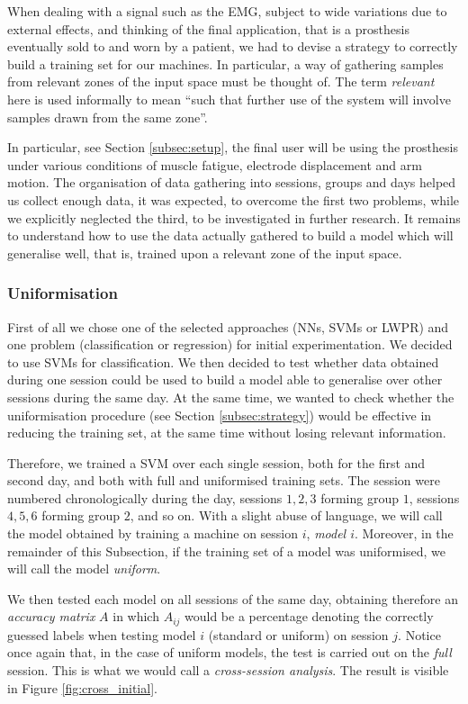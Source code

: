 When dealing with a signal such as the EMG, subject to wide variations
due to external effects, and thinking of the final application, that
is a prosthesis eventually sold to and worn by a patient, we had to
devise a strategy to correctly build a training set for our
machines. In particular, a way of gathering samples from relevant
zones of the input space must be thought of. The term \emph{relevant}
here is used informally to mean ``such that further use of the system
will involve samples drawn from the same zone''.

In particular, see Section \ref{subsec:setup}, the final user will be
using the prosthesis under various conditions of muscle fatigue,
electrode displacement and arm motion. The organisation of data
gathering into sessions, groups and days helped us collect enough
data, it was expected, to overcome the first two problems, while we
explicitly neglected the third, to be investigated in further
research. It remains to understand how to use the data actually
gathered to build a model which will generalise well, that is, trained
upon a relevant zone of the input space.

\subsubsection{Uniformisation}

First of all we chose one of the selected approaches (NNs, SVMs or
LWPR) and one problem (classification or regression) for initial
experimentation. We decided to use SVMs for classification. We then
decided to test whether data obtained during one session could be used
to build a model able to generalise over other sessions during the
same day. At the same time, we wanted to check whether the
uniformisation procedure (see Section \ref{subsec:strategy}) would be
effective in reducing the training set, at the same time without
losing relevant information.

Therefore, we trained a SVM over each single session, both for the
first and second day, and both with full and uniformised training
sets. The session were numbered chronologically during the day,
sessions $1,2,3$ forming group $1$, sessions $4,5,6$ forming group
$2$, and so on. With a slight abuse of language, we will call the
model obtained by training a machine on session $i$, \emph{model
$i$}. Moreover, in the remainder of this Subsection, if the training
set of a model was uniformised, we will call the model \emph{uniform}.

We then tested each model on all sessions of the same day, obtaining
therefore an \emph{accuracy matrix} $A$ in which $A_{ij}$ would be a
percentage denoting the correctly guessed labels when testing model
$i$ (standard or uniform) on session $j$. Notice once again that, in
the case of uniform models, the test is carried out on the \emph{full}
session. This is what we would call a \emph{cross-session analysis}.
The result is visible in Figure \ref{fig:cross_initial}.

